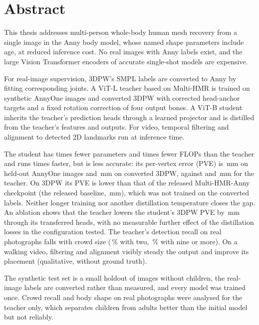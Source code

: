 \chapter*{Abstract}

This thesis addresses multi-person whole-body human mesh recovery from a single image in the Anny body model, whose
named shape parameters include age, at reduced inference cost. No real images with Anny labels exist,
and the large Vision Transformer encoders of accurate single-shot models are expensive.

For real-image supervision, 3DPW's SMPL labels are converted to Anny by fitting corresponding joints. A ViT-L teacher based on
Multi-HMR is trained on synthetic AnnyOne images and converted 3DPW with corrected head-anchor targets
and a fixed rotation correction of four output bones. A ViT-B student inherits the
teacher's prediction heads through a learned projector and is distilled from the teacher's features and outputs.
For video, temporal filtering and alignment to detected 2D landmarks run at inference time.

The student has \ParamRatioStudent{} times fewer parameters and \FlopRatioStudent{} times fewer FLOPs than the
teacher and runs \SpeedRatioStudent{} times faster, but is less accurate: its per-vertex error (PVE) is
\StudentPVE\,mm on held-out AnnyOne images and \StudentThreeDPW\,mm on converted 3DPW, against \FinalPVE{} and
\FinalThreeDPW\,mm for the teacher. On 3DPW its PVE is lower than that of the released Multi-HMR-Anny checkpoint
(the released baseline, \NAVERThreeDPW\,mm), which was not trained on the converted labels. Neither longer training
nor another distillation temperature closes the gap. An ablation shows that the teacher lowers the student's 3DPW PVE by \AblNoTeachDiffTP\,mm through its
transferred heads, with no measurable further effect of the distillation losses in the configuration tested.
The teacher's detection recall on real photographs falls with crowd size (\CrowdFinalTwoRec\,\% with two, \CrowdFinalNinePlusRec\,\%
with nine or more). On a walking video, filtering and alignment visibly steady
the output and improve its placement (qualitative, without ground truth).

The synthetic test set is a small holdout of \MethodHoldoutN{} images without children, the real-image labels are
converted rather than measured, and every model was trained once. Crowd recall and body shape on real photographs were analysed for the teacher only,
which separates children from adults better than the initial model but not reliably.
